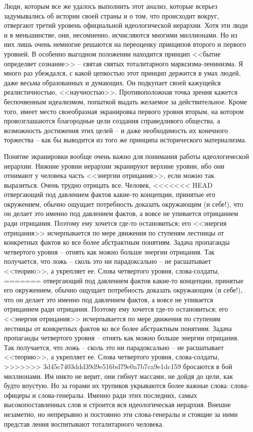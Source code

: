\documentclass{book}
\begin{document}
Люди, которым все же удалось выполнить этот анализ, кото­рые всерьез задумывались об истории своей страны и о том, что происходит 
вокруг, отвергают третий уровень официальной идеологической иерархии. Хотя эти люди и в меньшинстве, они, несомненно, 
исчисляются многими миллионами. Но из них лишь очень немногие решаются на переоценку принципов второго и первого уровней. В 
особенно выгодном положении находится принцип <<бытие определяет сознание>> -- святая свя­тых тоталитарного марксизма-ленинизма. 
Я много раз убеж­дался, с какой цепкостью этот принцип держится в умах лю­дей, даже весьма образованных и думающих. Он подкупает 
своей кажущейся реалистичностью, <<научностью>>. Противопо­ложная точка зрения кажется беспочвенным идеализмом, по­пыткой выдать 
желаемое за действительное. Кроме того, имеет место своеобразная экранировка  первого уровня вторым, на котором провозглашаются 
благородные цели создания справедливого общества, а возможность достижения этих целей -- и даже необходимость их конечного 
торжества -- как бы вы­водится из того же принципа исторического материализма.

Понятие экранировки вообще очень важно для понимания работы идеологической иерархии. Нижние уровни иерархии экранируют верхние 
уровни, ибо они отнимают у человека часть <<энергии отрицания>>, если можно так выразиться. Очень трудно отрицать все. Человек, 
<<<<<<< HEAD
отвергающий под давлением фактов какие‑то концепции, принятые его окружением, обыч­но ощущает потребность доказать окружающим (и 
себе!), что он делает это именно под давлением фактов, а вовсе не упива­ется отрицанием ради отрицания. Поэтому ему хочется 
где‑то остановиться; его <<энергия отрицания>> исчерпывается по мере движения по ступеням лестницы от конкретных фактов ко все 
более абстрактным понятиям. Задача пропаганды четвер­того уровня -- отнять как можно больше энергии отрицания. Так получается, 
что ложь -- сколь это ни парадоксально -- не расшатывает <<теорию>>, а укрепляет ее. Слова четвертого уров­ня, слова‑солдаты, 
=======
отвергающий под давлением фактов какие-то концепции, принятые его окружением, обыч­но ощущает потребность доказать окружающим (и 
себе!), что он делает это именно под давлением фактов, а вовсе не упива­ется отрицанием ради отрицания. Поэтому ему хочется 
где-то остановиться; его <<энергия отрицания>> исчерпывается по мере движения по ступеням лестницы от конкретных фактов ко все 
более абстрактным понятиям. Задача пропаганды четвер­того уровня -- отнять как можно больше энергии отрицания. Так получается, 
что ложь -- сколь это ни парадоксально -- не расшатывает <<теорию>>, а укрепляет ее. Слова четвертого уров­ня, слова-солдаты, 
>>>>>>> 3d45c7403ddd39d9e516bd79e0a7b7ca9e1dc159
бросаются в бой миллионами. Им никто не верит, они гибнут массами, не дойдя до цели, как будто впустую. Но за горами их трупиков 
укрываются более важные слова: слова-офицеры и слова-генералы. Именно ради этих последних, самых высокопоставленных слов и 
строится вся идеологическая иерархия. Внешне незаметно, но непрерывно и постоянно эти слова-генералы и стоящие за ними представ­
ления воспитывают тоталитарного человека.
\end{document}
